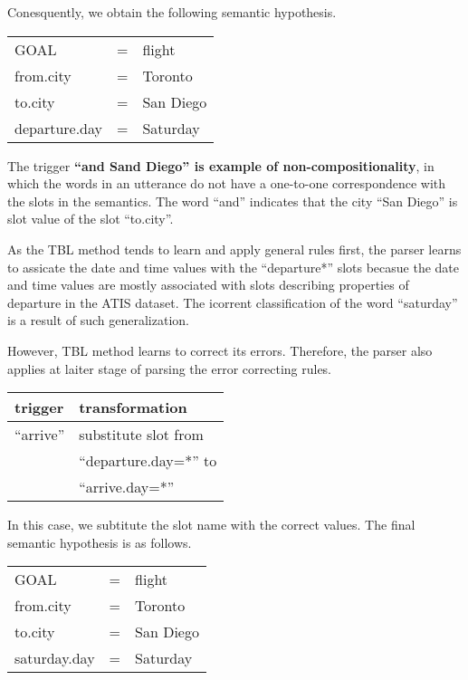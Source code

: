 \documentclass[11pt]{article}
\begin{document}
Conesquently, we obtain the following semantic hypothesis. 

\vspace{.25cm}
\begin{tabular}{lll}
  GOAL          & = & flight \\
  from.city     & = & Toronto \\
  to.city       & = & San Diego \\
  departure.day & = & Saturday \\
\end{tabular} 
\vspace{.25cm}

The trigger \textbf{``and Sand Diego'' is example of non-compositionality}, in which the words in an utterance do not have a one-to-one correspondence with the slots in the semantics. The word ``and'' indicates that the city ``San Diego'' is slot value of the slot ``to.city''. 

As the TBL method tends to learn and apply general rules first, the parser learns to assicate the date and time values with the ``departure*'' slots becasue the date and time values are mostly associated with slots describing properties of departure in the ATIS dataset. The icorrent classification of the word ``saturday'' is a result of such generalization. 

However, TBL method learns to correct its errors. Therefore, the parser also applies at laiter stage of parsing the error correcting rules. 

\vspace{.25cm}
\begin{tabular}{ll}
  trigger & transformation \\
  \hline 
  ``arrive''            & substitute slot from\\
                        & ``departure.day=*'' to \\
                        & ``arrive.day=*'' \\
\end{tabular} 
\vspace{.25cm}

In this case, we subtitute the slot name with the correct values. The final semantic hypothesis is as follows.

\vspace{.25cm}
\begin{tabular}{lll}
  GOAL          & = & flight \\
  from.city     & = & Toronto \\
  to.city       & = & San Diego \\
  saturday.day & = & Saturday \\
\end{tabular} 
\vspace{.25cm}
\end{document}
